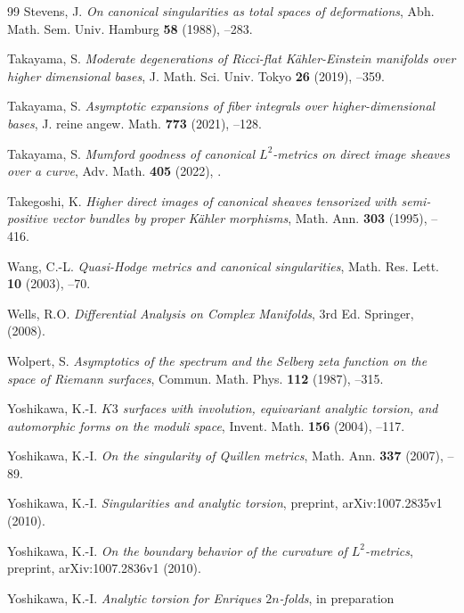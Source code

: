 \documentclass[amscd, leqno]{amsart}
\theoremstyle{plain}
\theoremstyle{definition}
\theoremstyle{remark}
\begin{document}
\begin{thebibliography}{99}
Stevens, J.
\newblock 
\textit{On canonical singularities as total spaces of deformations},
\newblock 
Abh. Math. Sem. Univ. Hamburg
\newblock 
{\bf 58}
\newblock 
(1988),
--283.


Takayama, S.
\newblock
\textit{Moderate degenerations of Ricci-flat K\"ahler-Einstein manifolds over higher dimensional bases},
\newblock
J. Math. Sci. Univ. Tokyo
\newblock
{\bf 26}
\newblock
(2019),
--359.


Takayama, S.
\newblock
\textit{Asymptotic expansions of fiber integrals over higher-dimensional bases},
\newblock
J. reine angew. Math. 
\newblock
{\bf 773} 
\newblock
(2021), 
--128.


Takayama, S.
\newblock
\textit{Mumford goodness of canonical $L^{2}$-metrics on direct image sheaves over a curve},
\newblock
Adv. Math. 
\newblock
{\bf 405} 
\newblock
(2022), 
.


Takegoshi, K.
\newblock 
\textit{Higher direct images of canonical sheaves tensorized with semi-positive vector bundles by proper K\"ahler morphisms},
\newblock 
Math. Ann.
\newblock 
{\bf 303}
\newblock 
(1995),
--416.


Wang, C.-L.
\newblock
\textit{Quasi-Hodge metrics and canonical singularities},
\newblock
Math. Res. Lett.
\newblock
{\bf 10}
\newblock
(2003),
--70.


Wells, R.O.
\newblock
\textit{Differential Analysis on Complex Manifolds},
\newblock
3rd Ed.
\newblock
Springer,
\newblock
(2008).


Wolpert, S.
\newblock 
\textit{Asymptotics of the spectrum and the Selberg zeta function on the space of Riemann surfaces},
\newblock 
Commun. Math. Phys.
\newblock 
{\bf 112}
\newblock 
(1987),
--315.


Yoshikawa, K.-I.
\newblock 
\textit{$K3$ surfaces with involution, equivariant analytic torsion, and automorphic forms on the moduli space},
\newblock 
Invent. Math.
\newblock 
{\bf 156}
\newblock 
(2004),
--117.


Yoshikawa, K.-I.
\newblock 
\textit{On the singularity of Quillen metrics},
\newblock 
Math. Ann. 
\newblock 
{\bf 337}
\newblock 
(2007),
--89.


Yoshikawa, K.-I.
\newblock 
\textit{Singularities and analytic torsion},
\newblock
preprint,
\newblock 
arXiv:1007.2835v1
\newblock
(2010).


Yoshikawa, K.-I.
\newblock 
\textit{On the boundary behavior of the curvature of $L^{2}$-metrics},
\newblock
preprint,
\newblock 
arXiv:1007.2836v1
\newblock
(2010).


Yoshikawa, K.-I.
\newblock 
\textit{Analytic torsion for Enriques $2n$-folds},
\newblock
in preparation


\end{thebibliography}
\end{document}
